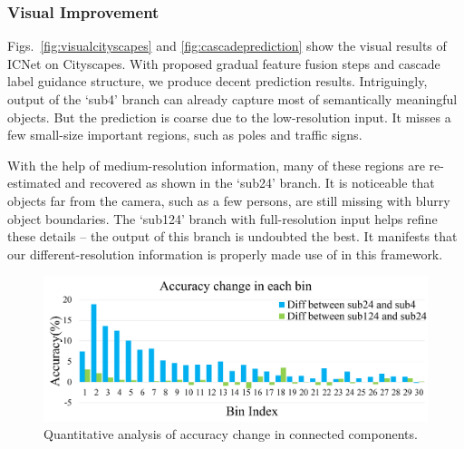 \documentclass[runningheads]{llncs}
\begin{document}
\subsubsection{Visual Improvement}
Figs.~\ref{fig:visualcityscapes} and \ref{fig:cascadeprediction} show the visual results of ICNet on Cityscapes. With proposed gradual feature fusion steps and cascade label guidance structure, we produce decent prediction results. Intriguingly, output of the `sub4' branch can already capture most of semantically meaningful objects. But the prediction is coarse due to the low-resolution input. It misses a few small-size important regions, such as poles and traffic signs. 

With the help of medium-resolution information, many of these regions are re-estimated and recovered as shown in the `sub24' branch. It is noticeable that objects far from the camera, such as a few persons, are still missing with blurry object boundaries. The `sub124' branch with full-resolution input helps refine these details -- the output of this branch is undoubted the best. It manifests that our different-resolution information is properly made use of in this framework.

\begin{figure}[bpt]
	\begin{center}
		\includegraphics[width=0.85\linewidth]{figure/binacc.png}%
	\end{center}
	\caption{Quantitative analysis of accuracy change in connected components.}
	\label{fig:binacc}
\end{figure}
\end{document}
